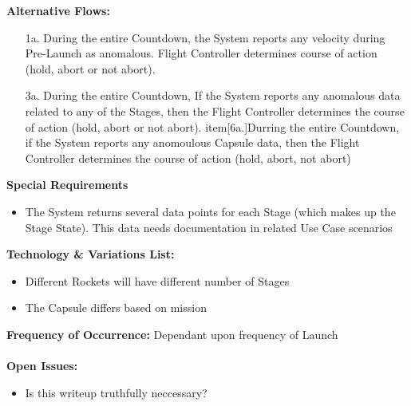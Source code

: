\documentclass[letterpaper]{article}
\begin{document}
\textbf{Alternative Flows:}
\begin{itemize}
\item[1a.]During the entire Countdown, the System reports any
velocity during Pre-Launch as anomalous.  Flight Controller determines
course of action (hold, abort or not abort).
\item[3a.]During the entire Countdown, If the System reports any
anomalous data related to any of the Stages, then the Flight Controller
determines the course of action (hold, abort or not abort).
item[6a.]Durring the entire Countdown, if the System reports any
anomoulous Capsule data, then the Flight Controller determines the
course of action (hold, abort, not abort)
\end{itemize}
\textbf{Special Requirements}
\begin{itemize}
\item The System returns several data points for each
Stage (which makes up the Stage State). This data needs
documentation in related Use Case scenarios
\end{itemize}
\textbf{Technology \& Variations List:}
\begin{itemize}
\item Different Rockets will have different number of Stages
\item The Capsule differs based on mission
\end{itemize}
\textbf{Frequency of Occurrence:  }Dependant upon frequency of
Launch\\\\
\textbf{Open Issues:}
\begin{itemize}
\item Is this writeup truthfully neccessary?
\end{itemize}
\end{document}
